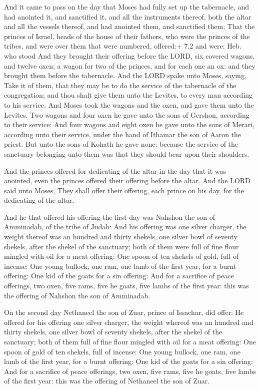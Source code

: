  And it came to pass on the day that Moses had fully set up
the tabernacle, and had anointed it, and sanctified it, and all the
instruments thereof, both the altar and all the vessels thereof, and had
anointed them, and sanctified them;  That the princes of
Israel, heads of the house of their fathers, who were the princes of the
tribes, and were over them that were numbered, offered:+ 7.2 and were:
Heb. who stood  And they brought their offering before the
LORD, six covered wagons, and twelve oxen; a wagon for two of the
princes, and for each one an ox: and they brought them before the
tabernacle.  And the LORD spake unto Moses, saying,
 Take it of them, that they may be to do the service of the
tabernacle of the congregation; and thou shalt give them unto the
Levites, to every man according to his service.  And Moses
took the wagons and the oxen, and gave them unto the Levites.
 Two wagons and four oxen he gave unto the sons of Gershon,
according to their service:  And four wagons and eight oxen
he gave unto the sons of Merari, according unto their service, under the
hand of Ithamar the son of Aaron the priest.  But unto the
sons of Kohath he gave none: because the service of the sanctuary
belonging unto them was that they should bear upon their shoulders.

 And the princes offered for dedicating of the altar in
the day that it was anointed, even the princes offered their offering
before the altar.  And the LORD said unto Moses, They shall
offer their offering, each prince on his day, for the dedicating of the
altar.

 And he that offered his offering the first day was
Nahshon the son of Amminadab, of the tribe of Judah:  And
his offering was one silver charger, the weight thereof was an hundred
and thirty shekels, one silver bowl of seventy shekels, after the shekel
of the sanctuary; both of them were full of fine flour mingled with oil
for a meat offering:  One spoon of ten shekels of gold,
full of incense:  One young bullock, one ram, one lamb of
the first year, for a burnt offering:  One kid of the goats
for a sin offering:  And for a sacrifice of peace
offerings, two oxen, five rams, five he goats, five lambs of the first
year: this was the offering of Nahshon the son of Amminadab.

 On the second day Nethaneel the son of Zuar, prince of
Issachar, did offer:  He offered for his offering one
silver charger, the weight whereof was an hundred and thirty shekels,
one silver bowl of seventy shekels, after the shekel of the sanctuary;
both of them full of fine flour mingled with oil for a meat offering:
 One spoon of gold of ten shekels, full of incense:
 One young bullock, one ram, one lamb of the first year,
for a burnt offering:  One kid of the goats for a sin
offering:  And for a sacrifice of peace offerings, two
oxen, five rams, five he goats, five lambs of the first year: this was
the offering of Nethaneel the son of Zuar.

